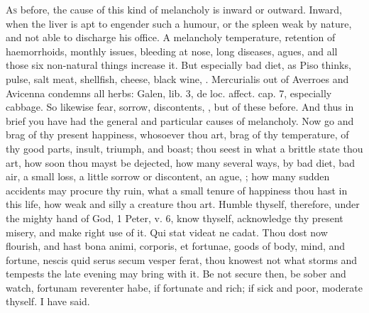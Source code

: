 {\lettrine{A}{s} before, the cause of this kind of melancholy is inward or outward.
Inward, when the liver is apt to engender such a humour, or the
spleen weak by nature, and not able to discharge his office. A
melancholy temperature, retention of haemorrhoids, monthly issues,
bleeding at nose, long diseases, agues, and all those six non-natural
things increase it. But especially bad diet, as Piso thinks,
pulse, salt meat, shellfish, cheese, black wine, \etc{}. Mercurialis out of
Averroes and Avicenna condemns all herbs: Galen, lib. 3, de loc.
affect. cap. 7, especially cabbage. So likewise fear, sorrow,
discontents, \etc{}, but of these before. And thus in brief you have had
the general and particular causes of melancholy.
Now go and brag of thy present happiness, whosoever thou art, brag of
thy temperature, of thy good parts, insult, triumph, and boast; thou
seest in what a brittle state thou art, how soon thou mayst be
dejected, how many several ways, by bad diet, bad air, a small loss, a
little sorrow or discontent, an ague, \etc{}; how many sudden accidents
may procure thy ruin, what a small tenure of happiness thou hast in
this life, how weak and silly a creature thou art. Humble thyself,
therefore, under the mighty hand of God, 1 Peter, v. 6, know thyself,
acknowledge thy present misery, and make right use of it. Qui stat
videat ne cadat. Thou dost now flourish, and hast bona animi, corporis,
et fortunae, goods of body, mind, and fortune, nescis quid serus secum
vesper ferat, thou knowest not what storms and tempests the late
evening may bring with it. Be not secure then, be sober and watch,
fortunam reverenter habe, if fortunate and rich; if sick and
poor, moderate thyself. I have said.
}
